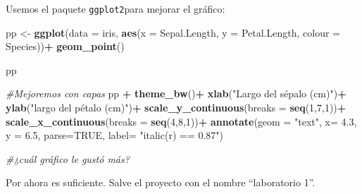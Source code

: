 \documentclass[]{article}
\newenvironment{Shaded}{\begin{snugshade}}{\end{snugshade}}
\newcommand{\CommentTok}[1]{\textcolor[rgb]{0.56,0.35,0.01}{\textit{#1}}}
\newcommand{\DataTypeTok}[1]{\textcolor[rgb]{0.13,0.29,0.53}{#1}}
\newcommand{\DecValTok}[1]{\textcolor[rgb]{0.00,0.00,0.81}{#1}}
\newcommand{\FloatTok}[1]{\textcolor[rgb]{0.00,0.00,0.81}{#1}}
\newcommand{\KeywordTok}[1]{\textcolor[rgb]{0.13,0.29,0.53}{\textbf{#1}}}
\newcommand{\NormalTok}[1]{#1}
\newcommand{\OperatorTok}[1]{\textcolor[rgb]{0.81,0.36,0.00}{\textbf{#1}}}
\newcommand{\OtherTok}[1]{\textcolor[rgb]{0.56,0.35,0.01}{#1}}
\newcommand{\StringTok}[1]{\textcolor[rgb]{0.31,0.60,0.02}{#1}}
\begin{document}
Usemos el paquete \texttt{ggplot2}para mejorar el gráfico:

\begin{Shaded}
\begin{Highlighting}[]
\NormalTok{pp <-}\StringTok{ }\KeywordTok{ggplot}\NormalTok{(}\DataTypeTok{data =}\NormalTok{ iris, }\KeywordTok{aes}\NormalTok{(}\DataTypeTok{x =}\NormalTok{ Sepal.Length, }\DataTypeTok{y =}\NormalTok{ Petal.Length, }\DataTypeTok{colour =}\NormalTok{ Species))}\OperatorTok{+}
\StringTok{      }\KeywordTok{geom_point}\NormalTok{()}
  
\NormalTok{pp  }
  
\CommentTok{#Mejoremos con capas}
\NormalTok{pp }\OperatorTok{+}\StringTok{  }\KeywordTok{theme_bw}\NormalTok{()}\OperatorTok{+}
\StringTok{      }\KeywordTok{xlab}\NormalTok{(}\StringTok{"Largo del sépalo (cm)"}\NormalTok{)}\OperatorTok{+}
\StringTok{      }\KeywordTok{ylab}\NormalTok{(}\StringTok{"largo del pétalo (cm)"}\NormalTok{)}\OperatorTok{+}
\StringTok{      }\KeywordTok{scale_y_continuous}\NormalTok{(}\DataTypeTok{breaks =} \KeywordTok{seq}\NormalTok{(}\DecValTok{1}\NormalTok{,}\DecValTok{7}\NormalTok{,}\DecValTok{1}\NormalTok{))}\OperatorTok{+}
\StringTok{      }\KeywordTok{scale_x_continuous}\NormalTok{(}\DataTypeTok{breaks =} \KeywordTok{seq}\NormalTok{(}\DecValTok{4}\NormalTok{,}\DecValTok{8}\NormalTok{,}\DecValTok{1}\NormalTok{))}\OperatorTok{+}
\StringTok{      }\KeywordTok{annotate}\NormalTok{(}\DataTypeTok{geom =} \StringTok{"text"}\NormalTok{, }\DataTypeTok{x=} \FloatTok{4.3}\NormalTok{, }\DataTypeTok{y =} \FloatTok{6.5}\NormalTok{, }\DataTypeTok{parse=}\OtherTok{TRUE}\NormalTok{, }\DataTypeTok{label=} \StringTok{"italic(r) == 0.87"}\NormalTok{)}
      
\CommentTok{#¿cuál gráfico le gustó más? }
\end{Highlighting}
\end{Shaded}

Por ahora es suficiente. Salve el proyecto con el nombre ``laboratorio
1''.
\end{document}
